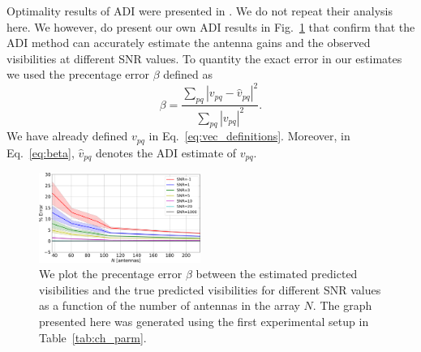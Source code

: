 \documentclass[useAMS,usenatbib]{mn2e}
\begin{document}
Optimality results of ADI were presented in \citet{Marthi2014}. We do not repeat their analysis here. We however, do present our own ADI results in Fig.~\ref{fig:prec_error} that confirm that the
ADI method can accurately estimate the antenna gains and the observed visibilities at different SNR values. To quantity the exact error in our estimates we used the precentage error $\beta$ defined 
as 
\begin{equation}
\label{eq:beta}
\beta = \frac{\sum_{pq} |v_{pq} - \widehat{v}_{pq} |^2}{\sum_{pq} |v_{pq}|^2}.
\end{equation}
We have already defined $v_{pq}$ in Eq.~\eqref{eq:vec_definitions}. Moreover, in Eq.~\eqref{eq:beta}, $\widehat{v}_{pq}$ denotes the ADI estimate of $v_{pq}$.  

\begin{figure}
\includegraphics[width=0.47\textwidth]{./prec_error.pdf} 
\caption{We plot the precentage error $\beta$ between the estimated 
predicted visibilities and the true predicted visibilities for different SNR values as a function of the number of antennas in the array $N$. The graph presented here was generated using the first experimental setup in Table~\ref{tab:ch_parm}.}
\label{fig:prec_error}
\end{figure}

% 
% 
% 
% 
% 
% 
% 
\end{document}
